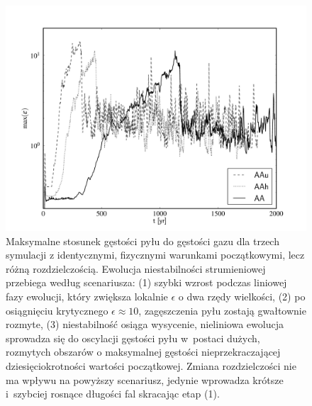 \begin{figure}
   \includegraphics[width=0.98\linewidth]{figures/fig4}
   \caption{
      Maksymalne stosunek gęstości pyłu do gęstości gazu dla trzech symulacji z
      identycznymi, fizycznymi warunkami początkowymi, lecz różną
      rozdzielczością. Ewolucja niestabilności strumieniowej przebiega według
      scenariusza: (1) szybki wzrost podczas liniowej fazy ewolucji, który
      zwiększa lokalnie $\epsilon$ o dwa rzędy wielkości, (2) po
      osiągnięciu krytycznego $\epsilon\approx 10$, zagęszczenia pyłu zostają
      gwałtownie rozmyte, (3) niestabilność osiąga wysycenie, nieliniowa
      ewolucja sprowadza się do oscylacji gęstości pyłu w~postaci dużych,
      rozmytych obszarów o maksymalnej gęstości nieprzekraczającej
      dziesięciokrotności wartości początkowej. Zmiana rozdzielczości nie ma
      wpływu na powyższy scenariusz, jedynie wprowadza krótsze i~szybciej
   rosnące długości fal skracając etap (1).}

   \label{fig4}
\end{figure}
%

